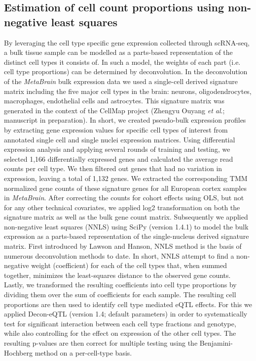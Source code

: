 \subsection{Estimation of cell count proportions using non-negative least squares}
By leveraging the cell type specific gene expression collected through scRNA-seq, a bulk tissue sample can be modelled as a parts-based representation of the distinct cell types it consists of. In such a model, the weights of each part (i.e. cell type proportions) can be determined by deconvolution. In the deconvolution of the \textit{MetaBrain} bulk expression data we used a single-cell derived signature matrix including the five major cell types in the brain: neurons, oligodendrocytes, macrophages, endothelial cells and astrocytes. This signature matrix was generated in the context of the CellMap project (Zhengyu Ouyang \textit{et al}.; manuscript in preparation). In short, we created pseudo-bulk expression profiles by extracting gene expression values for specific cell types of interest from annotated single cell and single nuclei expression matrices. Using differential expression analysis and applying several rounds of training and testing, we selected 1,166 differentially expressed genes and calculated the average read counts per cell type. We then filtered out genes that had no variation in expression, leaving a total of 1,132 genes. We extracted the corresponding TMM normalized gene counts of these signature genes for all European cortex samples in \textit{MetaBrain}. After correcting the counts for cohort effects using OLS, but not for any other technical covariates, we applied log2 transformation on both the signature matrix as well as the bulk gene count matrix. Subsequently we applied non-negative least squares (NNLS)\cite{lawsonSolvingLeastSquares1995} using SciPy (version 1.4.1)\cite{virtanenSciPyFundamentalAlgorithms2020} to model the bulk expression as a parts-based representation of the single-nucleus derived signature matrix. First introduced by Lawson and Hanson\cite{lawsonSolvingLeastSquares1995}, NNLS method is the basis of numerous deconvolution methods to date. In short, NNLS attempt to find a non-negative weight (coefficient) for each of the cell types that, when summed together, minimizes the least-squares distance to the observed gene counts. Lastly, we transformed the resulting coefficients into cell type proportions by dividing them over the sum of coefficients for each sample. The resulting cell proportions are then used to identify cell type mediated eQTL effects. For this we applied Decon-eQTL\cite{raulaguirregamboaDeconvolutionBulkBlood2020} (version 1.4; default parameters) in order to systematically test for significant interaction between each cell type fractions and genotype, while also controlling for the effect on expression of the other cell types. The resulting p-values are then correct for multiple testing using the Benjamini-Hochberg method on a per-cell-type basis. 

